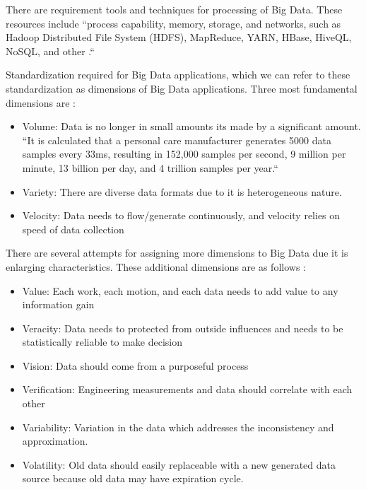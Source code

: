 \documentclass[sigconf]{acmart}
\begin{document}
\par There are requirement tools and techniques for processing of Big Data. These resources include ``process capability, memory, storage, and networks, such as Hadoop Distributed File System (HDFS), MapReduce, YARN, HBase, HiveQL, NoSQL, and other \cite{BABICEANU2016128}.``

\par Standardization required for Big Data applications, which we can refer to these standardization as dimensions of Big Data applications. Three most fundamental dimensions are \cite{BABICEANU2016128, ZHONG2016572}:

\begin{itemize}
    \item Volume: Data is no longer in small amounts its made by a significant amount. ``It is calculated that a personal care manufacturer generates 5000 data samples every 33ms, resulting in 152,000 samples per second, 9 million per minute, 13 billion per day, and 4 trillion samples per year.``
    \item Variety: There are diverse data formats due to it is heterogeneous nature. 
    \item Velocity: Data needs to flow/generate continuously, and velocity relies on speed of data collection
\end{itemize}

\par There are several attempts for assigning more dimensions to Big Data due it is enlarging characteristics. These additional dimensions are as follows \cite{BABICEANU2016128}: 

\begin{itemize}
    \item Value: Each work, each motion, and each data needs to add value to any information gain
    \item Veracity: Data needs to protected from outside influences and needs to be statistically reliable to make decision
    \item Vision: Data should come from a purposeful process
    \item Verification: Engineering measurements and data should correlate with each other
    \item Variability: Variation in the data which addresses the inconsistency and approximation. 
    \item Volatility: Old data should easily replaceable with a new generated data source because old data may have expiration cycle.
    \end{itemize}
    
\end{document}
